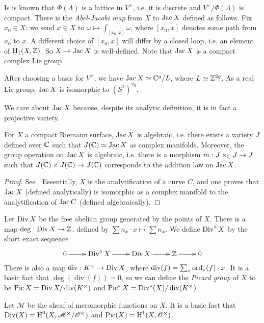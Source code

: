 \documentclass{article}
\begin{document}
Is is known that $\Phi(\Lambda)$ is a lattice in $V^\vee$, i.e. it is discrete 
and $V^\vee/\Phi(\Lambda)$ is compact. There is the \emph{Abel-Jacobi map} from 
$X$ to $\operatorname{Jac} X$ defined as follows. Fix $x_0\in X$; we send $x\in X$ to 
$\omega\mapsto \int_{[x_0,x]} \omega$, where $[x_0,x]$ denotes some path from 
$x_0$ to $x$. A different choice of $[x_0,x]$ will differ by a closed loop, 
i.e. an element of $\operatorname{H}_1(X,\mathbb{Z})$. So $X\to\operatorname{Jac} X$ is well-defined. Note 
that $\operatorname{Jac} X$ is a compact complex Lie group. 

\begin{remark}
After choosing a basis for $V^\vee$, we have $\operatorname{Jac} X\simeq \mathbb{C}^g/L$, where 
$L\simeq \mathbb{Z}^{2 g}$. As a real Lie group, $\operatorname{Jac} X$ is isomorphic to 
$(S^1)^{2 g}$. 
\end{remark}

We care about $\operatorname{Jac} X$ because, despite its analytic definition, it is in fact 
a projective variety.

\begin{theorem}
For $X$ a compact Riemann surface, $\operatorname{Jac} X$ is algebraic, i.e. there exists a 
variety $J$ defined over $\mathbb{C}$ such that $J(\mathbb{C})\simeq\operatorname{Jac} X$ as 
complex manifolds. Moreover, the group operation on $\operatorname{Jac} X$ is algebraic, 
i.e. there is a morphism $m:J\times_{\mathbb{C}} J\to J$ such that 
$J(\mathbb{C})\times J(\mathbb{C})\to J(\mathbb{C})$ corresponds to the 
addition law on $\operatorname{Jac} X$. 
\end{theorem}
\begin{proof}
See \cite[I.18]{mi}. Essentially, $X$ is the analytification of a curve $C$, 
and one proves that $\operatorname{Jac} X$ (defined analytically) is isomorphic as a complex 
manifold to the analytification of $\operatorname{Jac} C$ (defined algebraically). 
\end{proof}

Let $\operatorname{Div} X$ be the free abelian group generated by the points of $X$. There 
is a map $\deg:\operatorname{Div} X\to \mathbb{Z}$, defined by 
$\sum n_x\cdot x\mapsto \sum n_x$. We define $\operatorname{Div}^\circ X$ by the short exact 
sequence 
\[\xymatrix{
  0 \ar[r]
    & \Div^\circ X \ar[r]
    & \Div X \ar[r]
    & \dZ \ar[r]
    & 0
}\]
There is also a map $\operatorname{div}:K^\times\to \operatorname{Div} X$, where 
$\operatorname{div}(f) = \sum_x \operatorname{ord}_x(f)\cdot x$. It is a basic fact that 
$\deg(\operatorname{div}(f)) = 0$, so we can define the \emph{Picard group} 
of $X$ to be $\operatorname{Pic} X = \operatorname{Div} X/\operatorname{div}(K^\times)$ and 
$\operatorname{Pic}^\circ X = \operatorname{Div}^\circ (X)/\operatorname{div}(K^\times)$. 

\begin{remark}
Let $\mathscr{M}$ be the sheaf of meromorphic functions on $X$. It is a basic 
fact that $\operatorname{Div}(X)=\operatorname{H}^0(X,\mathscr{M}^\times/\mathscr{O}^\times)$ and 
$\operatorname{Pic}(X)=\operatorname{H}^1(X,\mathscr{O}^\times)$. 
\end{remark}
\end{document}
